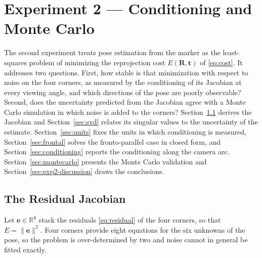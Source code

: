 \documentclass[11pt,a4paper]{article}
\theoremstyle{definition}
\theoremstyle{plain}
\theoremstyle{remark}
\newcommand{\R}{\mathbb{R}}
\begin{document}
\section{Experiment 2 --- Conditioning and Monte Carlo}
\label{sec:experiment2}

The second experiment treats pose estimation from the marker as the
least-squares problem of minimizing the reprojection cost $E(\mathbf{R},\mathbf{t})$
of \eqref{eq:cost}. It addresses two questions. First, how stable is that
minimization with respect to noise on the four corners, as measured by the
conditioning of its Jacobian at every viewing angle, and which directions of
the pose are poorly observable? Second, does the uncertainty predicted from the
Jacobian agree with a Monte Carlo simulation in which noise is added to the
corners? Section~\ref{sec:jacobian} derives the Jacobian and
Section~\ref{sec:svd} relates its singular values to the uncertainty of the
estimate. Section~\ref{sec:units} fixes the units in which conditioning is
measured, Section~\ref{sec:frontal} solves the fronto-parallel case in closed
form, and Section~\ref{sec:conditioning} reports the conditioning along the
camera arc. Section~\ref{sec:montecarlo} presents the Monte Carlo validation and
Section~\ref{sec:exp2-discussion} draws the conclusions.

\subsection{The Residual Jacobian}
\label{sec:jacobian}

Let $\mathbf{e}\in\R^{8}$ stack the residuals \eqref{eq:residual} of the four
corners, so that $E = \|\mathbf{e}\|^2$. Four corners provide eight equations
for the six unknowns of the pose, so the problem is over-determined by two and
noise cannot in general be fitted exactly.
\end{document}
